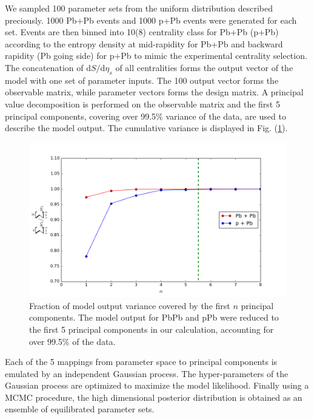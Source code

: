 \documentclass[aps,prl,twocolumn,groupedaddress]{revtex4-1}
\begin{document}
	We sampled 100 parameter sets from the uniform distribution described preciously.
	1000 Pb+Pb events and 1000 p+Pb events were generated for each set.  
	Events are then binned into 10(8) centrality class for Pb+Pb (p+Pb) according to the entropy density at mid-rapidity for Pb+Pb and backward rapidity (Pb going side) for p+Pb to mimic the experimental centrality selection.
	The concatenation of $\mathrm{d}S/\mathrm{d}\eta_s$ of all centralities forms the output vector of the model with one set of parameter inputs. 
	The 100 output vector forms the observable matrix, while parameter vectors forms the design matrix. 
	A principal value decomposition is performed on the observable matrix and the first 5 principal components, covering over 99.5$\%$ variance of the data, are used to describe the model output. 
	The cumulative variance is displayed in Fig. (\ref{weight}).
	
	\begin{figure}
	\begin{center}
	\includegraphics[width=\columnwidth]{pics/weight.png}
	\caption{Fraction of model output variance covered by the first $n$ principal components. The model output for PbPb and pPb were reduced to the first 5 principal components in our calculation, accounting for over 99.5\% of the data.}\label{weight}
	\end{center}
	\end{figure}
	
	Each of the 5 mappings from parameter space to principal components is emulated by an independent Gaussian process.
	The hyper-parameters of the Gaussian process are optimized to maximize the model likelihood.
	Finally using a MCMC procedure, the high dimensional posterior distribution is obtained as an ensemble of equilibrated parameter sets.
	
\end{document}
